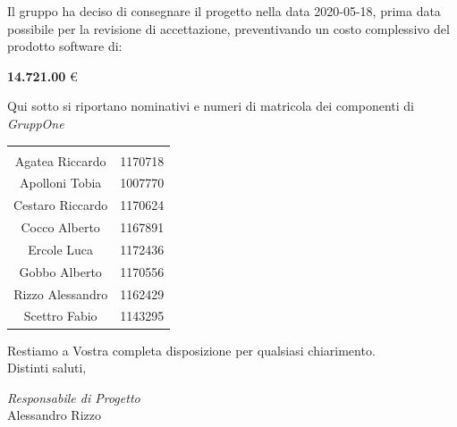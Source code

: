 \documentclass{article}
\begin{document}
Il gruppo ha deciso di consegnare il progetto nella data 2020-05-18, prima data possibile per la revisione di accettazione, preventivando un costo complessivo del prodotto software di:
\begin{center}
  \textbf{14.721.00} €
\end{center}

Qui sotto si riportano nominativi e numeri di matricola dei componenti di \textit{GruppOne}
\begin{table}[H]%
  \label{tab:componenti}
  \centering
  \begin{tabular}[c]{c c}
    \rowcolor{darkgray!90!}\color{white}{\textbf{Nominativo}} & \color{white}{\textbf{Matricola}} \\
    Agatea Riccardo                                           & 1170718                           \\
    Apolloni Tobia                                            & 1007770                           \\
    Cestaro Riccardo                                          & 1170624                           \\
    Cocco Alberto                                             & 1167891                           \\
    Ercole Luca                                               & 1172436                           \\
    Gobbo Alberto                                             & 1170556                           \\
    Rizzo Alessandro                                          & 1162429                           \\
    Scettro Fabio                                             & 1143295                           \\
  \end{tabular}
\end{table}
Restiamo a Vostra completa disposizione per qualsiasi chiarimento.\\
Distinti saluti,

\hspace{2cm}
\begin{adjustwidth}{2.5cm}{10.5cm}
  \centering
  \textit{Responsabile di Progetto}\\
  Alessandro Rizzo\\
  \hspace{2cm}
  \underline{\color{white}{Responsabile di Progetto}}
\end{adjustwidth}
\end{document}
